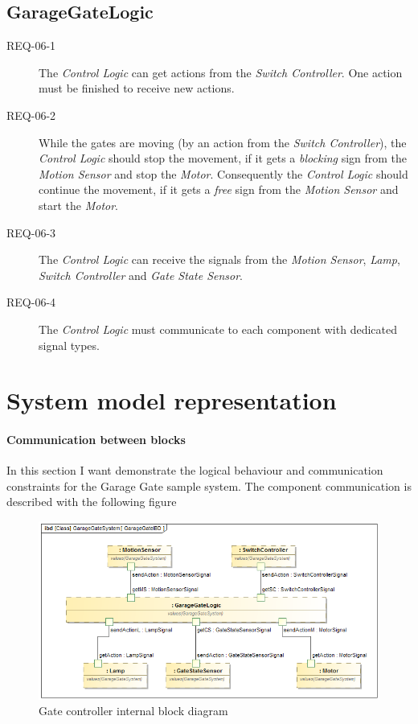 \subsection{GarageGateLogic}
\begin{description}
	\item [REQ-06-1] The \textit{Control Logic} can get actions from the \textit{Switch Controller}. One action must be finished to receive new actions.
	\item [REQ-06-2] While the gates are moving (by an action from the \textit{Switch Controller}), the \textit{Control Logic} should stop the movement, if it gets a \textit{blocking} sign from the \textit{Motion Sensor} and stop the \textit{Motor}. Consequently the \textit{Control Logic} should continue the movement, if it gets a \textit{free} sign from the \textit{Motion Sensor} and start the \textit{Motor}.
	\item [REQ-06-3] The \textit{Control Logic} can receive the signals from the \textit{Motion Sensor}, \textit{Lamp}, \textit{Switch Controller} and \textit{Gate State Sensor}.
	\item [REQ-06-4] The \textit{Control Logic} must communicate to each component with dedicated signal types.
\end{description}

\section{System model representation}\label{subsect:Representation}
\paragraph{Communication between blocks}
In this section I want demonstrate the logical behaviour and communication constraints for the Garage Gate sample system.
The component communication is described with the following figure 

\begin{figure}[!ht]
	\centering
	\includegraphics[width=150mm, keepaspectratio]{figures/magicDraw/ibd__GarageGateSystem__GarageGateIBD.png}
	\caption{Gate controller internal block diagram}
	\label{fig:GateLogicComm}
\end{figure}

